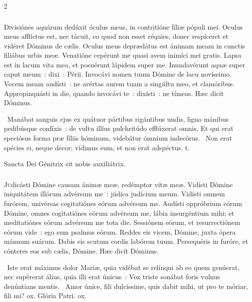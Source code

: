 \documentclass[9pt,twoside]{extarticle}
\begin{document}
\begin{multicols}{2}
{{\subsubsection*{\center {}}
\lettrine{D}ivisiónes aquárum dedúxit óculus meus, in contritióne fíliæ pópuli mei.
Oculus meus afflíctus est, nec tácuit, eo quod non esset réquies,
donec respíceret et vidéret Dóminus de cælis.
Oculus meus deprædátus est ánimam meam in cunctis filiábus urbis meæ.
Venatióne cepérunt me quasi avem inimíci mei gratis.
Lapsa est in lacum vita mea, et posuérunt lápidem super me.
Inundavérunt aquæ super caput meum~: dixi~: Périi.
Invocávi nomen tuum Dómine de lacu novíssimo.
Vocem meam audísti~: ne avértas aurem tuam a singúltu meo, et clamóribus.
Appropinquásti in die, quando invocávi te~: dixísti~: ne tímeas. Hæc dicit Dóminus.

\begin{tightlist}{}
\item {}~Manábat sanguis ejus ex quátuor pártibus rigántibus undis, ligno mánibus pedibúsque confíxis~: de vultu illíus pulchritúdo efflúxerat omnis, \textred{*} Et qui erat speciósus forma præ fíliis hóminum, videbátur ómnium indecórus. ~Non erat spécies ei, neque decor; vídimus eum, et non erat adspéctus. t.
\item {\small {} Sancta Dei Génitrix sit nobis auxiliátrix.}
\end{tightlist}

\subsubsection*{\center {}}
\lettrine{J}udicásti Dómine causam ánimæ meæ, redémptor vitæ meæ.
Vidísti Dómine iniquitátem illórum advérsum me~: júdica judícium meum.
Vidísti omnem furórem, univérsas cogitatiónes eórum advérsum me.
Audísti oppróbrium eórum Dómine, omnes cogitatiónes eórum advérsum me,
lábia insurgéntium mihi; et meditatiónes eórum advérsum me tota die.
Sessiónem eórum, et resurrectiónem eórum vide~: ego sum psalmus eórum.
Reddes eis vicem, Dómine, juxta ópera mánuum suárum.
Dabis eis scutum cordis labórem tuum.
Persequéris in furóre, et cónteres eos sub cælis, Dómine. Hæc dicit Dóminus.

\begin{tightlist}{}
\item {}~Iste erat máximus dolor Maríæ, quia vidébat se relínqui ab eo quem genúerat, nec supérerat álius, quia illi erat únicus~: \textred{*} Vox triste sonábat foris vulnus denúntians mentis. ~Amor únice, fili dulcíssime, quis dabit mihi, ut pro te móriar, fili mi? ox. Glória Patri. ox.
\end{tightlist}

}}
\end{multicols}
\end{document}
